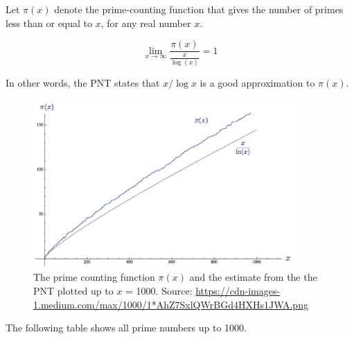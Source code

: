 \begin{theorem}
Let $\pi(x)$ denote the prime-counting function that gives the number of primes less than or equal to $x$, for any real number $x$.

\[ \lim_{x \to \infty} \frac{\pi(x)}{\frac{x}{\log{(x)}}} = 1\]
\end{theorem}

In other words, the \textsc{PNT} states that $x / \log{x}$ is a good approximation to $\pi(x)$.

\begin{figure}[h!] \vspace{10pt} \centering
\vspace{7pt}
\includegraphics[width=10cm]{figures/prime-number-theorem-absolute.png}
\vspace{7pt}
\caption[Distribution of prime numbers regarding Prime Number Theorem ]{The prime counting function $\pi(x)$ and the estimate from the the \textsc{PNT} plotted up to $x$ = 1000. Source: \url{https://cdn-images-1.medium.com/max/1000/1*AhZ7SxlQWrBGd4HXHs1JWA.png}}
\label{prime-distribution}
\vspace{-5mm}
\end{figure}

The following table shows all prime numbers up to 1000.

